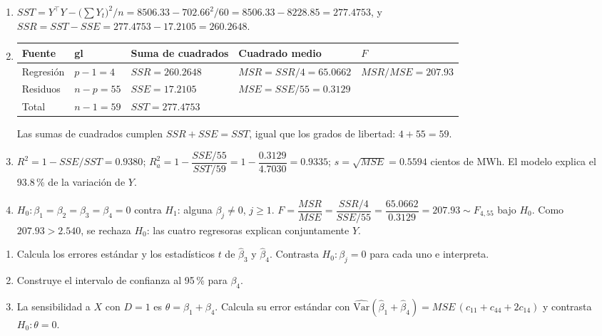 \begin{solucion}
\begin{enumerate}
  \item $SST=Y^\top Y-\bigl(\sum Y_t\bigr)^2/n=8506.33-702.66^2/60=8506.33-8228.85=277.4753$, y $SSR=SST-SSE=277.4753-17.2105=260.2648$.
  \item \leavevmode
  \begin{center}\small
  \begin{tabular}{@{}llll l@{}}
  \toprule
  Fuente & gl & Suma de cuadrados & Cuadrado medio & $F$\\
  \midrule
  Regresión & $p-1=4$ & $SSR=260.2648$ & $MSR=SSR/4=65.0662$ & $MSR/MSE=207.93$\\
  Residuos & $n-p=55$ & $SSE=17.2105$ & $MSE=SSE/55=0.3129$ & \\
  Total & $n-1=59$ & $SST=277.4753$ & & \\
  \bottomrule
  \end{tabular}
  \end{center}
  Las sumas de cuadrados cumplen $SSR+SSE=SST$, igual que los grados de libertad: $4+55=59$.
  \item $R^2=1-SSE/SST=0.9380$; $R^2_{a}=1-\dfrac{SSE/55}{SST/59}=1-\dfrac{0.3129}{4.7030}=0.9335$; $s=\sqrt{MSE}=0.5594$ cientos de MWh. El modelo explica el 93.8\,\% de la variación de $Y$.
  \item $H_0:\beta_1=\beta_2=\beta_3=\beta_4=0$ contra $H_1$: alguna $\beta_j\neq0$, $j\ge1$. $F=\dfrac{MSR}{MSE}=\dfrac{SSR/4}{SSE/55}=\dfrac{65.0662}{0.3129}=207.93\sim F_{4,55}$ bajo $H_0$. Como $207.93>2.540$, se rechaza $H_0$: las cuatro regresoras explican conjuntamente $Y$.
\end{enumerate}
\end{solucion}

\begin{enumerate}
  \item Calcula los errores estándar y los estadísticos $t$ de $\hat\beta_3$ y $\hat\beta_4$. Contrasta $H_0:\beta_j=0$ para cada uno e interpreta.
  \item Construye el intervalo de confianza al 95\,\% para $\beta_4$.
  \item La sensibilidad a $X$ con $D=1$ es $\theta=\beta_1+\beta_4$. Calcula su error estándar con $\widehat{\mathrm{Var}}(\hat\beta_1+\hat\beta_4)=MSE\,(c_{11}+c_{44}+2c_{14})$ y contrasta $H_0:\theta=0$.
\end{enumerate}

